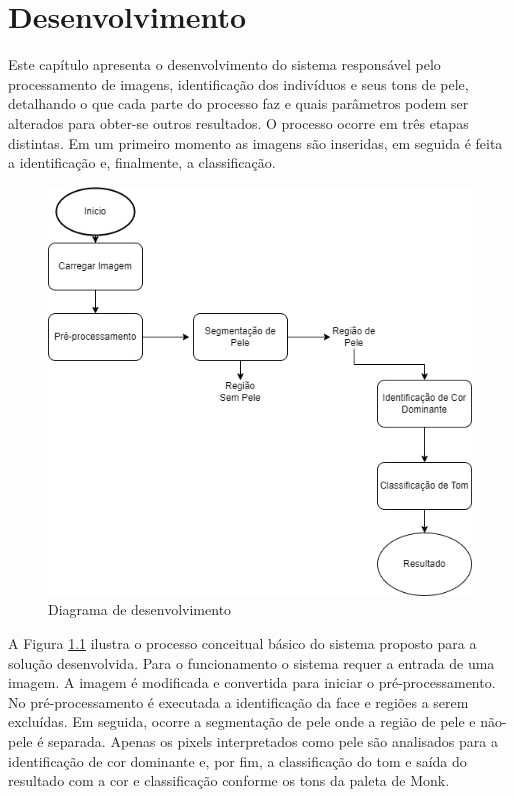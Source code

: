 \chapter{Desenvolvimento}
\label{cap:desenvolvimento}
Este capítulo apresenta o desenvolvimento do sistema responsável pelo processamento de imagens, identificação dos indivíduos e seus tons de pele, detalhando o que cada parte do processo faz e quais parâmetros podem ser alterados para obter-se outros resultados. O processo ocorre em três etapas
distintas. Em um primeiro momento as imagens são inseridas, em seguida é feita a identificação e, finalmente, a classificação.

\begin{figure}[h]
\centering
\caption{Diagrama de desenvolvimento}
\includegraphics[scale=0.65]{Template_Latex_TCC-UNIFTEC/_lib/imagens/fluxogramaDesenvolvimento.png}

\label{fig: fluxograma_desenvolvimento}
\end{figure}

A Figura \ref{fig: fluxograma_desenvolvimento} ilustra o processo conceitual básico do sistema proposto para a solução desenvolvida. Para o funcionamento o sistema requer a entrada de uma imagem. A imagem é modificada e convertida para iniciar o pré-processamento. No pré-processamento é executada a identificação da face e regiões a serem excluídas. Em seguida, ocorre a segmentação de pele onde a região de pele e não-pele é separada. Apenas os pixels interpretados como pele são analisados para a identificação de cor dominante e, por fim, a classificação do tom  e saída do resultado com a cor e classificação conforme os tons da paleta de Monk.

